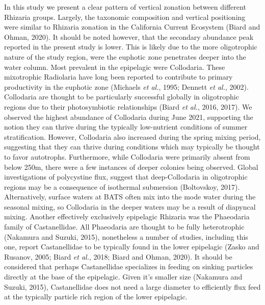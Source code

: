\documentclass[
]{article}
\begin{document}
In this study we present a clear pattern of vertical zonation between
different Rhizaria groups. Largely, the taxonomic composition and
vertical positioning were similar to Rhizaria zonation in the California
Current Ecosystem (Biard and Ohman, 2020). It should be noted however,
that the secondary abundance peak reported in the present study is
lower. This is likely due to the more oligotrophic nature of the study
region, were the euphotic zone penetrates deeper into the water column.
Most prevalent in the epipelagic were Collodaria. These mixotrophic
Radiolaria have long been reported to contribute to primary productivity
in the euphotic zone (Michaels \emph{et al.}, 1995; Dennett \emph{et
al.}, 2002). Collodaria are thought to be particularly successful
globally in oligotrophic regions due to their photosymbiotic
relationships (Biard \emph{et al.}, 2016, 2017). We observed the highest
abundance of Collodaria during June 2021, supporting the notion they can
thrive during the typically low-nutrient conditions of summer
stratification. However, Collodaria also increased during the spring
mixing period, suggesting that they can thrive during conditions which
may typically be thought to favor autotrophs. Furthermore, while
Collodaria were primarily absent from below 250m, there were a few
instances of deeper colonies being observed. Global investigations of
polycystine flux, suggest that deep-Collodaria in oligotrophic regions
may be a consequence of isothermal submersion (Boltovskoy, 2017).
Alternatively, surface waters at BATS often mix into the mode water
during the seasonal mixing, so Collodaria in the deeper waters may be a
result of diapyncal mixing. Another effectively exclusively epipelagic
Rhizaria was the Phaeodaria family of Castanellidae. All Phaeodaria are
thought to be fully heterotrophic (Nakamura and Suzuki, 2015),
nonetheless a number of studies, including this one, report
Castanellidae to be typically found in the lower epipelagic (Zasko and
Rusanov, 2005; Biard \emph{et al.}, 2018; Biard and Ohman, 2020). It
should be considered that perhaps Castanellidae specializes in feeding
on sinking particles directly at the base of the epipelagic. Given it's
smaller size (Nakamura and Suzuki, 2015), Castanellidae does not need a
large diameter to efficiently flux feed at the typically particle rich
region of the lower epipelagic.
\end{document}

